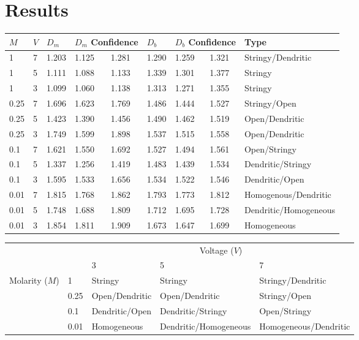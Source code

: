 \documentclass{article}
\theoremstyle{definition}
\theoremstyle{remark}
\begin{document}
\section{Results}
\begin{table}[!ht]
        \centering
        \begin{tabular}{|l|l|l|l|l|l|l|l|l|}
        \hline
            $M$ & $V$ & $D_m$ & \multicolumn{2}{c|}{$D_m$ Confidence} & $D_b$ & \multicolumn{2}{c|}{$D_b$ Confidence} & Type \\ \hline
            1 & 7 & 1.203 & 1.125 & 1.281 & 1.290 & 1.259 & 1.321 & Stringy/Dendritic \\ \hline
            1 & 5 & 1.111 & 1.088 & 1.133 & 1.339 & 1.301 & 1.377 & Stringy \\ \hline
            1 & 3 & 1.099 & 1.060 & 1.138 & 1.313 & 1.271 & 1.355 & Stringy \\ \hline
            0.25 & 7 & 1.696 & 1.623 & 1.769 & 1.486 & 1.444 & 1.527 & Stringy/Open \\ \hline
            0.25 & 5 & 1.423 & 1.390 & 1.456 & 1.490 & 1.462 & 1.519 & Open/Dendritic \\ \hline
            0.25 & 3 & 1.749 & 1.599 & 1.898 & 1.537 & 1.515 & 1.558 & Open/Dendritic \\ \hline
            0.1 & 7 & 1.621 & 1.550 & 1.692 & 1.527 & 1.494 & 1.561 & Open/Stringy \\ \hline
            0.1 & 5 & 1.337 & 1.256 & 1.419 & 1.483 & 1.439 & 1.534 & Dendritic/Stringy \\ \hline
            0.1 & 3 & 1.595 & 1.533 & 1.656 & 1.534 & 1.522 & 1.546 & Dendritic/Open \\ \hline
            0.01 & 7 & 1.815 & 1.768 & 1.862 & 1.793 & 1.773 & 1.812 & Homogenous/Dendritic \\ \hline
            0.01 & 5 & 1.748 & 1.688 & 1.809 & 1.712 & 1.695 & 1.728 & Dendritic/Homogeneous \\ \hline
            0.01 & 3 & 1.854 & 1.811 & 1.909 & 1.673 & 1.647 & 1.699 & Homogeneous \\ \hline
        \end{tabular}
    \end{table}

\begin{table}[!ht]
        \centering
        \begin{tabular}{|ll|l|l|l|}
        \hline
             ~& ~& \multicolumn{3}{c|}{Voltage ($V$)} \\ \cline{3-5}
             ~& ~& 3 & 5 & 7 \\ \hline
            \multirow{4}{*}{Molarity ($M$)} & 1 & Stringy & Stringy & Stringy/Dendritic \\
                                 & 0.25 & Open/Dendritic & Open/Dendritic & Stringy/Open \\     
                                 & 0.1 & Dendritic/Open & Dendritic/Stringy & Open/Stringy \\
                                 & 0.01 & Homogeneous & Dendritic/Homogeneous & Homogeneous/Dendritic \\ \hline
        \end{tabular}
    \end{table}
\end{document}
